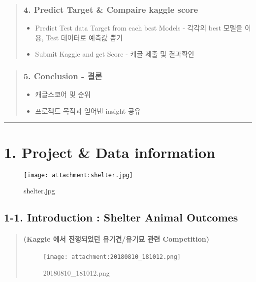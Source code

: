 \documentclass[11pt]{article}
\makeatletter
\def\maxwidth{\ifdim\Gin@nat@width>\linewidth\linewidth
    \else\Gin@nat@width\fi}
\let\Oldincludegraphics\includegraphics
\renewcommand{\includegraphics}[1]{\Oldincludegraphics[width=.8\maxwidth]{#1}}
\providecommand{\tightlist}{%
      \setlength{\itemsep}{0pt}\setlength{\parskip}{0pt}}
\makeatother
\begin{document}
\begin{quote}
\subsubsection{4. Predict Target \& Compaire kaggle
score}\label{predict-target-compaire-kaggle-score}

\begin{itemize}
\tightlist
\item
  Predict Test data Target from each best Models - 각각의 best 모델을
  이용, Test 데이터로 예측값 뽑기
\item
  Submit Kaggle and get Score - 캐글 제출 및 결과확인
\end{itemize}
\end{quote}

\begin{quote}
\subsubsection{5. Conclusion - 결론}\label{conclusion---uxacb0uxb860}

\begin{itemize}
\tightlist
\item
  캐글스코어 및 순위
\item
  프로젝트 목적과 얻어낸 insight 공유
\end{itemize}
\end{quote}

\begin{center}\rule{0.5\linewidth}{\linethickness}\end{center}

    \section{1. Project \& Data information}\label{project-data-information}

\begin{figure}
\centering
\texttt{[image: attachment:shelter.jpg]}
\caption{shelter.jpg}
\end{figure}

\subsection{1-1. Introduction : Shelter Animal
Outcomes}\label{introduction-shelter-animal-outcomes}

\begin{quote}
\mbox{}%
\paragraph{(Kaggle 에서 진행되었던 유기견/유기묘 관련
Competition)}\label{kaggle-uxc5d0uxc11c-uxc9c4uxd589uxb418uxc5c8uxb358-uxc720uxae30uxacacuxc720uxae30uxbb18-uxad00uxb828-competition}

\begin{figure}
\centering
\texttt{[image: attachment:20180810\_181012.png]}
\caption{20180810\_181012.png}
\end{figure}
\end{quote}
\end{document}
